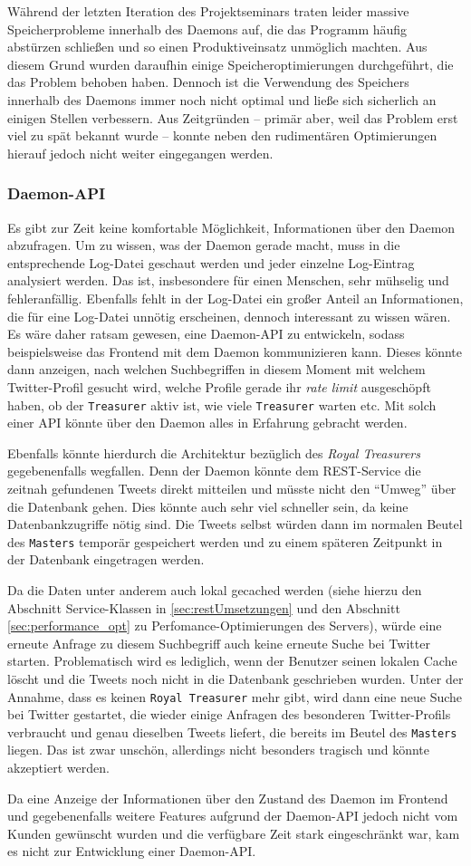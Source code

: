 Während der letzten Iteration des Projektseminars traten leider massive Speicherprobleme innerhalb des Daemons auf, die das Programm häufig abstürzen schließen und so einen Produktiveinsatz unmöglich machten.
Aus diesem Grund wurden daraufhin einige Speicheroptimierungen durchgeführt, die das Problem behoben haben.
Dennoch ist die Verwendung des Speichers innerhalb des Daemons immer noch nicht optimal und ließe sich sicherlich an einigen Stellen verbessern.
Aus Zeitgründen -- primär aber, weil das Problem erst viel zu spät bekannt wurde -- konnte neben den rudimentären Optimierungen hierauf jedoch nicht weiter eingegangen werden.

\subsubsection{Daemon-API}

Es gibt zur Zeit keine komfortable Möglichkeit, Informationen über den Daemon abzufragen.
Um zu wissen, was der Daemon gerade macht, muss in die entsprechende Log-Datei geschaut werden und jeder einzelne Log-Eintrag analysiert werden.
Das ist, insbesondere für einen Menschen, sehr mühselig und fehleranfällig.
Ebenfalls fehlt in der Log-Datei ein großer Anteil an Informationen, die für eine Log-Datei unnötig erscheinen, dennoch interessant zu wissen wären.
Es wäre daher ratsam gewesen, eine Daemon-API zu entwickeln, sodass beispielsweise das Frontend mit dem Daemon kommunizieren kann.
Dieses könnte dann anzeigen, nach welchen Suchbegriffen in diesem Moment mit welchem Twitter-Profil gesucht wird, welche Profile gerade ihr \textit{rate limit} ausgeschöpft haben, ob der \texttt{Treasurer} aktiv ist, wie viele \texttt{Treasurer} warten etc.
Mit solch einer API könnte über den Daemon alles in Erfahrung gebracht werden.

Ebenfalls könnte hierdurch die Architektur bezüglich des \textit{Royal Treasurers} gegebenenfalls wegfallen.
Denn der Daemon könnte dem REST-Service die zeitnah gefundenen Tweets direkt mitteilen und müsste nicht den "`Umweg"' über die Datenbank gehen.
Dies könnte auch sehr viel schneller sein, da keine Datenbankzugriffe nötig sind.
Die Tweets selbst würden dann im normalen Beutel des \texttt{Masters} temporär gespeichert werden und zu einem späteren Zeitpunkt in der Datenbank eingetragen werden.

Da die Daten unter anderem auch lokal gecached werden (siehe hierzu den Abschnitt Service-Klassen in \ref{sec:restUmsetzungen} und den Abschnitt \ref{sec:performance_opt} zu Perfomance-Optimierungen des Servers), würde eine erneute Anfrage zu diesem Suchbegriff auch keine erneute Suche bei Twitter starten.
Problematisch wird es lediglich, wenn der Benutzer seinen lokalen Cache löscht und die Tweets noch nicht in die Datenbank geschrieben wurden.
Unter der Annahme, dass es keinen \texttt{Royal Treasurer} mehr gibt, wird dann eine neue Suche bei Twitter gestartet, die wieder einige Anfragen des besonderen Twitter-Profils verbraucht und genau dieselben Tweets liefert, die bereits im Beutel des \texttt{Masters} liegen.
Das ist zwar unschön, allerdings nicht besonders tragisch und könnte akzeptiert werden.

Da eine Anzeige der Informationen über den Zustand des Daemon im Frontend und gegebenenfalls weitere Features aufgrund der Daemon-API jedoch nicht vom Kunden gewünscht wurden und die verfügbare Zeit stark eingeschränkt war, kam es nicht zur Entwicklung einer Daemon-API.
